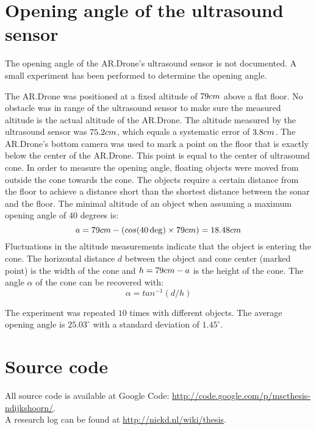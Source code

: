 \chapter{Opening angle of the ultrasound sensor}
\label{appendix:opening_angle}

The opening angle of the AR.Drone's ultrasound sensor is not documented.
A small experiment has been performed to determine the opening angle.

The AR.Drone was positioned at a fixed altitude of $79\small{cm}$ above a flat floor.
No obstacle was in range of the ultrasound sensor to make sure the measured altitude is the actual altitude of the AR.Drone.
The altitude measured by the ultrasound sensor was $75.2\small{cm}$, which equals a systematic error of $3.8\small{cm}$.
The AR.Drone's bottom camera was used to mark a point on the floor that is exactly below the center of the AR.Drone.
This point is equal to the center of ultrasound cone.
In order to measure the opening angle, floating objects were moved from outside the cone towards the cone.
The objects require a certain distance from the floor to achieve a distance short than the shortest distance between the sonar and the floor.
The minimal altitude of an object when assuming a maximum opening angle of $40$ degrees is:
\begin{equation}
a = 79\small{cm} - (cos(40\deg) \times 79\small{cm}) = 18.48\small{cm}
\end{equation}
Fluctuations in the altitude measurements indicate that the object is entering the cone.
The horizontal distance $d$ between the object and cone center (marked point) is the width of the cone and $h = 79\small{cm} - a$ is the height of the cone.
The angle $\alpha$ of the cone can be recovered with:
\begin{equation}
\alpha = tan^{-1}(d / h)
\end{equation}

The experiment was repeated $10$ times with different objects.
The average opening angle is $25.03^{\circ}$ with a standard deviation of $1.45^{\circ}$.





\chapter{Source code}
All source code is available at Google Code: \url{http://code.google.com/p/mscthesis-ndijkshoorn/}.
\\
A research log can be found at \url{http://nickd.nl/wiki/thesis}.